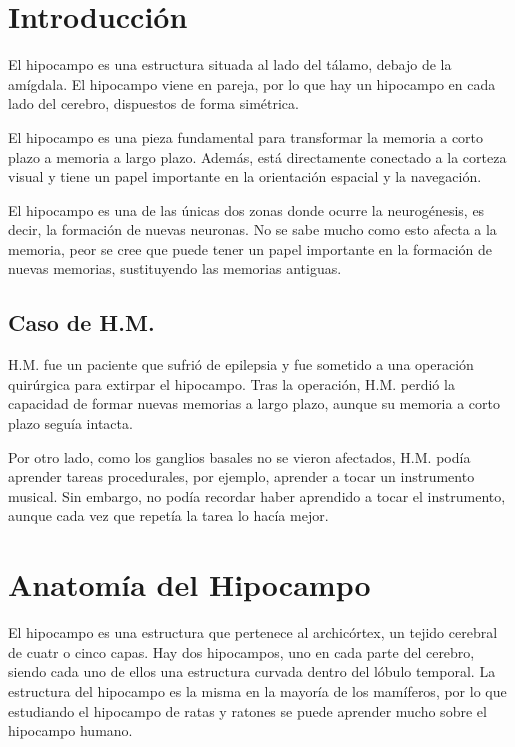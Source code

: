\documentclass[12pt, letterpaper]{article}
\title{\doctitle}
\author{Juan Luis Serradilla Tormos}
\date{\monthname[\month] de \the\year}
\begin{document}
\maketitle

\newpage
\tableofcontents

\newpage
\section{Introducción}
El hipocampo es una estructura  situada al lado del tálamo, debajo de la amígdala. El hipocampo viene en pareja, por lo que hay un hipocampo en cada lado del cerebro, dispuestos de forma simétrica.

El hipocampo es una pieza fundamental para transformar la memoria a corto plazo a memoria a largo plazo. Además, está directamente conectado a la corteza visual y tiene un papel importante en la orientación espacial y la navegación.

El hipocampo es una de las únicas dos zonas donde ocurre la neurogénesis, es decir, la formación de nuevas neuronas. No se sabe mucho como esto afecta a la memoria, peor se cree que puede tener un papel importante en la formación de nuevas memorias, sustituyendo las memorias antiguas.

\subsection{Caso de H.M.}
H.M. fue un paciente que sufrió de epilepsia y fue sometido a una operación quirúrgica para extirpar el hipocampo. Tras la operación, H.M. perdió la capacidad de formar nuevas memorias a largo plazo, aunque su memoria a corto plazo seguía intacta.

Por otro lado, como los ganglios basales no se vieron afectados, H.M. podía aprender tareas procedurales, por ejemplo, aprender a tocar un instrumento musical. Sin embargo, no podía recordar haber aprendido a tocar el instrumento, aunque cada vez que repetía la tarea lo hacía mejor.


\newpage
\section{Anatomía del Hipocampo}
El hipocampo es una estructura que pertenece al archicórtex, un tejido cerebral de cuatr o cinco capas. Hay dos hipocampos, uno en cada parte del cerebro, siendo cada uno de ellos una estructura curvada dentro del lóbulo temporal. La estructura del hipocampo es la misma en la mayoría de los mamíferos, por lo que estudiando el hipocampo de ratas y ratones se puede aprender mucho sobre el hipocampo humano.
\end{document}
